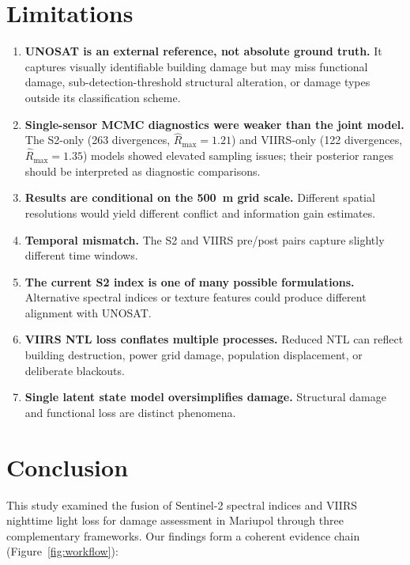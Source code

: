 \documentclass[wcp]{jmlr}
\begin{document}
\section{Limitations}\label{sec:limitations}

\begin{enumerate}
  \item \textbf{UNOSAT is an external reference, not absolute ground truth.}
    It captures visually identifiable building damage but may miss
    functional damage, sub-detection-threshold structural alteration, or
    damage types outside its classification scheme.
  \item \textbf{Single-sensor MCMC diagnostics were weaker than the joint
    model.} The S2-only (263 divergences, $\hat{R}_{\max}=1.21$) and
    VIIRS-only (122 divergences, $\hat{R}_{\max}=1.35$) models showed
    elevated sampling issues; their posterior ranges should be interpreted
    as diagnostic comparisons.
  \item \textbf{Results are conditional on the 500~m grid scale.} Different
    spatial resolutions would yield different conflict and information gain
    estimates.
  \item \textbf{Temporal mismatch.} The S2 and VIIRS pre/post pairs capture
    slightly different time windows.
  \item \textbf{The current S2 index is one of many possible formulations.}
    Alternative spectral indices or texture features could produce
    different alignment with UNOSAT.
  \item \textbf{VIIRS NTL loss conflates multiple processes.} Reduced NTL
    can reflect building destruction, power grid damage, population
    displacement, or deliberate blackouts.
  \item \textbf{Single latent state model oversimplifies damage.}
    Structural damage and functional loss are distinct phenomena.
\end{enumerate}

\section{Conclusion}\label{sec:conclusion}

This study examined the fusion of Sentinel-2 spectral indices and VIIRS
nighttime light loss for damage assessment in Mariupol through three
complementary frameworks. Our findings form a coherent evidence chain
(Figure~\ref{fig:workflow}):
\end{document}
